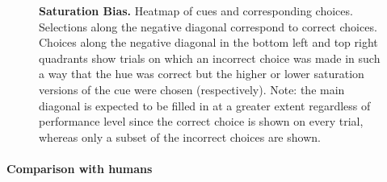 \begin{figure}

\caption{\textbf{Saturation Bias.}
Heatmap of cues and corresponding choices. Selections along the negative diagonal correspond to correct choices. Choices along the negative diagonal in the bottom left and top right quadrants show trials on which an incorrect choice was made in such a way that the hue was correct but the higher or lower saturation versions of the cue were chosen (respectively). Note: the main diagonal is expected to be filled in at a greater extent regardless of performance level since the correct choice is shown on every trial, whereas only a subset of the incorrect choices are shown.}
\label{fig:saturationBias}
\end{figure}



\paragraph{Comparison with humans} %

